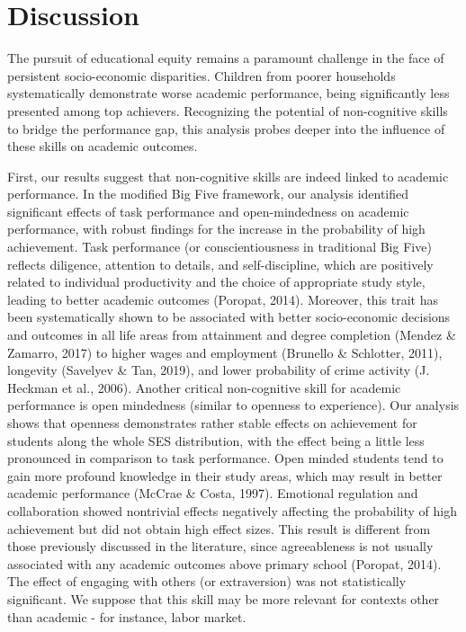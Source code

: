 \documentclass[
  12pt,
  a4paper,
]{article}
\begin{document}
\hypertarget{discussion}{%
\section{Discussion}\label{discussion}}

The pursuit of educational equity remains a paramount challenge in the
face of persistent socio-economic disparities. Children from poorer
households systematically demonstrate worse academic performance, being
significantly less presented among top achievers. Recognizing the
potential of non-cognitive skills to bridge the performance gap, this
analysis probes deeper into the influence of these skills on academic
outcomes.

First, our results suggest that non-cognitive skills are indeed linked
to academic performance. In the modified Big Five framework, our
analysis identified significant effects of task performance and
open-mindedness on academic performance, with robust findings for the
increase in the probability of high achievement. Task performance (or
conscientiousness in traditional Big Five) reflects diligence, attention
to details, and self-discipline, which are positively related to
individual productivity and the choice of appropriate study style,
leading to better academic outcomes (Poropat, 2014). Moreover, this
trait has been systematically shown to be associated with better
socio-economic decisions and outcomes in all life areas from attainment
and degree completion (Mendez \& Zamarro, 2017) to higher wages and
employment (Brunello \& Schlotter, 2011), longevity (Savelyev \& Tan,
2019), and lower probability of crime activity (J. Heckman et al.,
2006). Another critical non-cognitive skill for academic performance is
open mindedness (similar to openness to experience). Our analysis shows
that openness demonstrates rather stable effects on achievement for
students along the whole SES distribution, with the effect being a
little less pronounced in comparison to task performance. Open minded
students tend to gain more profound knowledge in their study areas,
which may result in better academic performance (McCrae \& Costa, 1997).
Emotional regulation and collaboration showed nontrivial effects
negatively affecting the probability of high achievement but did not
obtain high effect sizes. This result is different from those previously
discussed in the literature, since agreeableness is not usually
associated with any academic outcomes above primary school (Poropat,
2014). The effect of engaging with others (or extraversion) was not
statistically significant. We suppose that this skill may be more
relevant for contexts other than academic - for instance, labor market.
\end{document}
